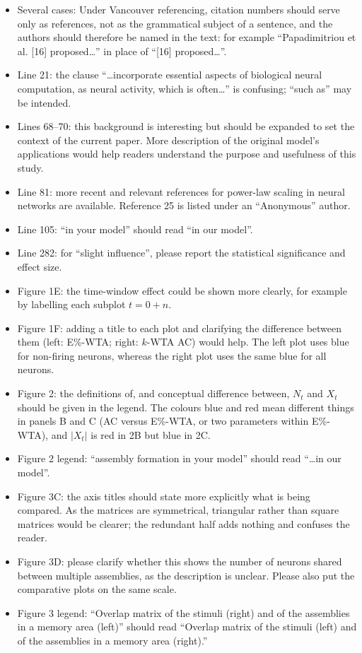 \documentclass[a4paper, 11pt]{article}
\begin{document}
\begin{itemize}
    \item Several cases: Under Vancouver referencing, citation numbers should serve only as references, not as the grammatical subject of a sentence, and the authors should therefore be named in the text: for example ``Papadimitriou et al. [16] proposed\dots'' in place of ``[16] proposed\dots''.
    \item Line 21: the clause ``\dots incorporate essential aspects of biological neural computation, as neural activity, which is often\dots'' is confusing; ``such as'' may be intended.
    \item Lines 68--70: this background is interesting but should be expanded to set the context of the current paper. More description of the original model's applications would help readers understand the purpose and usefulness of this study.
    \item Line 81: more recent and relevant references for power-law scaling in neural networks are available. Reference 25 is listed under an ``Anonymous'' author.
    \item Line 105: ``in your model'' should read ``in our model''.
    \item Line 282: for ``slight influence'', please report the statistical significance and effect size.
    \item Figure 1E: the time-window effect could be shown more clearly, for example by labelling each subplot $t = 0 + n$.
    \item Figure 1F: adding a title to each plot and clarifying the difference between them (left: E\%-WTA; right: $k$-WTA AC) would help. The left plot uses blue for non-firing neurons, whereas the right plot uses the same blue for all neurons.
    \item Figure 2: the definitions of, and conceptual difference between, $N_t$ and $X_t$ should be given in the legend. The colours blue and red mean different things in panels B and C (AC versus E\%-WTA, or two parameters within E\%-WTA), and $|X_t|$ is red in 2B but blue in 2C.
    \item Figure 2 legend: ``assembly formation in your model'' should read ``\dots in our model''.
    \item Figure 3C: the axis titles should state more explicitly what is being compared. As the matrices are symmetrical, triangular rather than square matrices would be clearer; the redundant half adds nothing and confuses the reader.
    \item Figure 3D: please clarify whether this shows the number of neurons shared between multiple assemblies, as the description is unclear. Please also put the comparative plots on the same scale.
    \item Figure 3 legend: ``Overlap matrix of the stimuli (right) and of the assemblies in a memory area (left)'' should read ``Overlap matrix of the stimuli (left) and of the assemblies in a memory area (right).''
\end{itemize}
\end{document}
